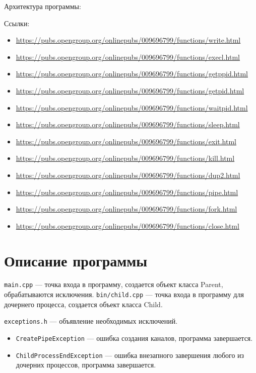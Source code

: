 Архитектура программы:


Ссылки:

\begin{itemize}
\item \url{https://pubs.opengroup.org/onlinepubs/009696799/functions/write.html}
\item \url{https://pubs.opengroup.org/onlinepubs/009696799/functions/execl.html}
\item \url{https://pubs.opengroup.org/onlinepubs/009696799/functions/getppid.html}
\item \url{https://pubs.opengroup.org/onlinepubs/009696799/functions/getpid.html}
\item \url{https://pubs.opengroup.org/onlinepubs/009696799/functions/waitpid.html}
\item \url{https://pubs.opengroup.org/onlinepubs/009696799/functions/sleep.html}
\item \url{https://pubs.opengroup.org/onlinepubs/009696799/functions/exit.html}
\item \url{https://pubs.opengroup.org/onlinepubs/009696799/functions/kill.html}
\item \url{https://pubs.opengroup.org/onlinepubs/009696799/functions/dup2.html}
\item \url{https://pubs.opengroup.org/onlinepubs/009696799/functions/pipe.html}
\item \url{https://pubs.opengroup.org/onlinepubs/009696799/functions/fork.html}
\item \url{https://pubs.opengroup.org/onlinepubs/009696799/functions/close.html}
\end{itemize}


\section{Описание программы}

\texttt{main.cpp} --- точка входа в программу, создается объект класса Parent, обрабатываются исключения.
\texttt{bin/child.cpp} --- точка входа в программу для дочернего процесса, создается объект класса Child.

\texttt{exceptions.h} --- объявление необходимых исключений.
\begin{itemize}
\item \texttt{CreatePipeException} --- ошибка создания каналов, программа завершается.
\item \texttt{ChildProcessEndException} --- ошибка внезапного завершения любого из дочерних процессов, программа завершается.
\end{itemize}

